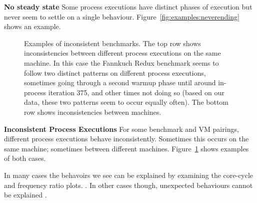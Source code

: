 \documentclass[preprint,numbers,10pt]{sigplanconf}
\begin{document}
\textbf{No steady state} \label{sub:long}
Some process executions have distinct phases of execution but never seem to
settle on a single behaviour. Figure~\ref{fig:examples:neverending} shows an
example.


\begin{figure}[t!]
\makebox[\textwidth][c]{~}  %
\caption{Examples of inconsistent benchmarks.
The top row shows inconsistencies between different process
executions on the same machine. In this case the Fannkuch Redux benchmark
seems to follow two distinct patterns on different process executions,
sometimes going through a second warmup phase until around in-process iteration 375, and
other times not doing so (based on our data, these two patterns seem to occur
equally often). The bottom row shows inconsistencies between
machines.}
\label{fig:examples:inconsistent}
\end{figure}

\textbf{Inconsistent Process Executions} \label{sub:inconsistent}
For some benchmark and VM pairings, different process executions behave
inconsistently. Sometimes this occurs on the same machine; sometimes between
different machines.
Figure~\ref{fig:examples:inconsistent} shows examples of both cases.

In many cases the behavoirs we see can be explained by examining the core-cycle
and frequency ratio plots. . In other cases though, unexpected
behaviours cannot be explained .
\end{document}
